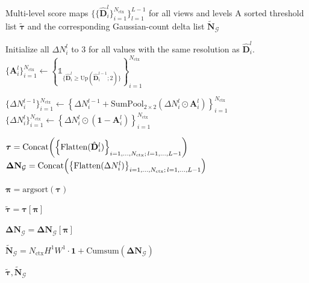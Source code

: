 

\begin{algorithm}[ht]
\caption{\textbf{Precomputing the threshold--budget lookup table}}
\label{alg:threshold_budget_lookup}
\begin{algorithmic}[1]
\Require Multi-level score maps $\{\{\hat{\mathbf{D}}_i^l\}_{i=1}^{N_\text{ctx}}\}^{L-1}_{l=1}$ for all views and levels
\Ensure A sorted threshold list $\tilde{\boldsymbol{\tau}}$ and the corresponding Gaussian-count delta list $\tilde{\mathbf{N}}_\mathcal{G}$

\State Initialize all $\Delta N_i^l$ to $3$ for all values with the same resolution as $\hat{\mathbf{D}}_i^l$.
    \State $\{\mathbf{A}_i^l\}_{i=1}^{N_\text{ctx}} \leftarrow \left\{ \mathds{1}_{\{\hat{\mathbf{D}}_i^l \ge \mathrm{Up}(\hat{\mathbf{D}}_i^{l-1};2)\}}\right\}_{i=1}^{N_\text{ctx}}$
    
    \State $\{\Delta N_i^{l-1} \}_{i=1}^{N_\text{ctx}} \leftarrow \left\{ \Delta N_i^{l-1} + \mathrm{SumPool}_{2\times2}\!\left(\Delta N_i^{l} \odot \mathbf{A}_i^l\right)\right\}_{i=1}^{N_\text{ctx}}$
    \State $\{\Delta N_i^{l} \}_{i=1}^{N_\text{ctx}} \leftarrow \left\{ \Delta N_i^{l} \odot (\mathbf{1}-\mathbf{A}_i^l) \right\}_{i=1}^{N_\text{ctx}}$
\EndFor

\State $\boldsymbol{{\tau}} = \mathrm{Concat}\!\left(\left\{\mathrm{Flatten}(\hat{\mathbf{D}}_i^l)\right\}_{i=1,\dots,N_{\text{ctx}};\,l=1,\dots,L-1}\right)$
\State $\boldsymbol{\Delta}\mathbf{N}_\mathcal{G} = \mathrm{Concat}\!\left(\left\{\mathrm{Flatten}(\Delta N_i^l)\right\}_{i=1,\dots,N_{\text{ctx}};\,l=1,\dots,L-1}\right)$

\State $\boldsymbol{\pi} = \text{argsort}(\boldsymbol{{\tau}})$

\State $\tilde{\boldsymbol{{\tau}}} = \boldsymbol{{\tau}}[\boldsymbol{\pi}]$

\State ${\boldsymbol{\Delta} \mathbf{N}}_\mathcal{G} = \boldsymbol{\Delta}\mathbf{N}_\mathcal{G}[\boldsymbol{\pi}]$

\State $\tilde{\mathbf{N}}_\mathcal{G} =  N_{\text{ctx}}H^1W^1 \cdot \mathbf{1} + \text{Cumsum}\left( {\boldsymbol{\Delta} \mathbf{N}}_\mathcal{G} \right) $

\State \Return $\tilde{\boldsymbol{{\tau}}}, \tilde{\mathbf{N}}_\mathcal{G}$
\end{algorithmic}
\end{algorithm}
